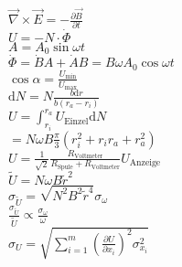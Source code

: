 \documentclass[20pt,a4paper]{scrartcl}
\begin{document}
 $\vec{\nabla}\times\vec{E}=-\frac{\partial\vec{B}}{\partial t}$\\
\vspace{10pt}
$U=-N\cdot\dot{\Phi}$\\
\vspace{10pt}
$A=A_0\sin{\omega t}$\\
\vspace{10pt}
$\dot{\Phi}= \dot{B}A+\dot{A}B=B\omega A_0 \cos{\omega t}$\\
\vspace{10pt}
$\cos{\alpha} =\frac{U_\text{min}}{U_\text{max}}$\\
\vspace{10pt}
$\text{d}N=N\frac{b\text{d}r}{b(r_a-r_i)}$\\
\vspace{10pt}
$U =\int^{r_a}_{r_i} U_\text{Einzel} \text{d}N$\\
\vspace{10pt}
$= N\omega B \frac{\pi}{3} (r_i^2+r_ir_a+r_a^2)$\\
\vspace{10pt}
$U= \frac{1}{\sqrt{2}} \frac{R_\text{Voltmeter}}{R_\text{Spule}+R_\text{Voltmeter}} U_\text{Anzeige}$\\
\vspace{10pt}
$\tilde{U}= N\omega B \tilde{r}^2$\\
\vspace{10pt}
$\sigma_{\tilde{U}}= \sqrt{N^2 B^2 \tilde{r}^4}\sigma_\omega$\\
\vspace{10pt}
$\frac{\sigma_{\tilde{U}}}{\tilde{U}}\propto \frac{\sigma_\omega}{\omega}$\\

$\sigma_{U} = \sqrt{\sum_{i=1}^m \left( \frac{\partial U}{\partial x_i}\right)^{\!2} \sigma_{x_i}^2}$
\end{document}
